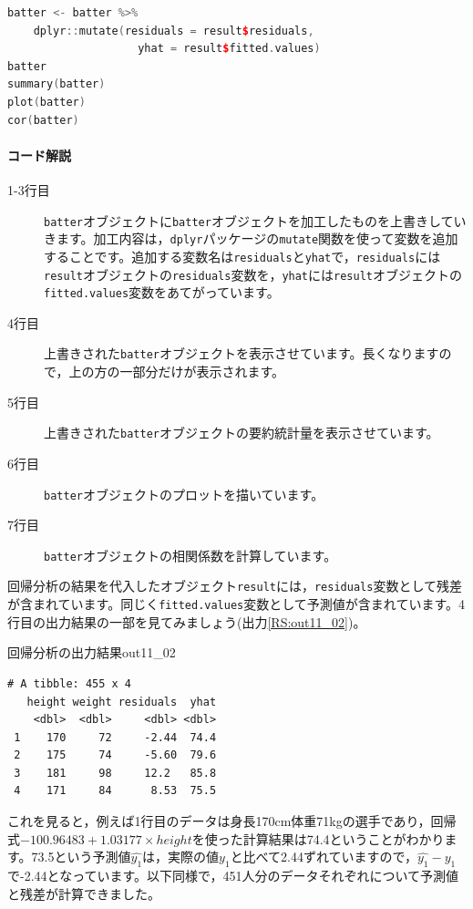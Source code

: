 \documentclass{ltjbook}
\begin{document}
\begin{lstlisting}[language=c++,label={code::11_05},caption={回帰分析のその他の情報}]
batter <- batter %>% 
    dplyr::mutate(residuals = result$residuals,
                    yhat = result$fitted.values) 
batter
summary(batter)
plot(batter)
cor(batter)
\end{lstlisting}

\paragraph{コード解説}
\begin{description}
    \item[1-3行目] \verb|batter|オブジェクトに\verb|batter|オブジェクトを加工したものを上書きしていきます。加工内容は，\verb|dplyr|パッケージの\verb|mutate|関数を使って変数を追加することです。追加する変数名は\verb|residuals|と\verb|yhat|で，\verb|residuals|には\verb|result|オブジェクトの\verb|residuals|変数を，\verb|yhat|には\verb|result|オブジェクトの\verb|fitted.values|変数をあてがっています。
    \item[4行目] 上書きされた\verb|batter|オブジェクトを表示させています。長くなりますので，上の方の一部分だけが表示されます。
    \item[5行目] 上書きされた\verb|batter|オブジェクトの要約統計量を表示させています。
    \item[6行目] \verb|batter|オブジェクトのプロットを描いています。
    \item[7行目] \verb|batter|オブジェクトの相関係数を計算しています。
\end{description}

回帰分析の結果を代入したオブジェクト\verb|result|には，\verb|residuals|変数として残差が含まれています。同じく\verb|fitted.values|変数として予測値が含まれています。4行目の出力結果の一部を見てみましょう(出力\ref{RS:out11_02})。
\begin{Rscreen}{回帰分析の出力結果}{out11_02}
\begin{verbatim}
# A tibble: 455 x 4
   height weight residuals  yhat
    <dbl>  <dbl>     <dbl> <dbl>
 1    170     72     -2.44  74.4
 2    175     74     -5.60  79.6
 3    181     98     12.2   85.8
 4    171     84      8.53  75.5
\end{verbatim}
\end{Rscreen}

これを見ると，例えば1行目のデータは身長170cm体重71kgの選手であり，回帰式$-100.96483 + 1.03177\times height $を使った計算結果は74.4ということがわかります。73.5という予測値$\hat{y_1}$は，実際の値$y_1$と比べて2.44ずれていますので，$\hat{y_1}-y_1$で-2.44となっています。以下同様で，451人分のデータそれぞれについて予測値と残差が計算できました。
\end{document}
